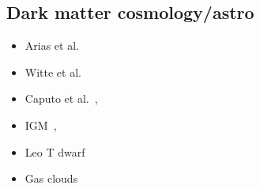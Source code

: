 \documentclass[10pt,twocolumn]{extarticle}
\begin{document}
\begin{mdframed}
\subsection*{Dark matter cosmology/astro}\vspace{-0.5em}
\begin{itemize}\setlength\itemsep{-0.5em}
\item  Arias et al.~\cite{Arias:2012az}
\item Witte et al.~\cite{McDermott:2019lch,Witte:2020rvb}
 \item  Caputo et al.~\cite{Caputo:2020rnx,Caputo:2020bdy}, 
 \item  IGM~\cite{Dubovsky:2015cca},
 \item  Leo T dwarf~\cite{Wadekar:2019xnf}
 \item  Gas clouds~\cite{Bhoonah:2019eyo}
\end{itemize}


\end{mdframed}
\end{document}
